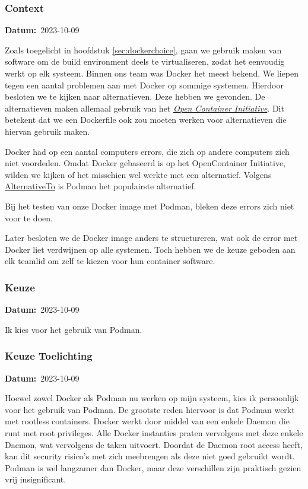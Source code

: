 \documentclass[a4paper]{report}
\newcommand{\timestamp}[1]{
  \mbox{\scriptsize \textbf{Datum:} #1} \smallbreak
}
\begin{document}
\subsubsection{Context}
\timestamp{2023-10-09}
Zoals toegelicht in hoofdstuk \ref{sec:dockerchoice}, gaan we gebruik maken van software om de build environment deels te virtualiseren, zodat het eenvoudig werkt op elk systeem.
Binnen ons team was Docker het meest bekend. We liepen tegen een aantal problemen aan met Docker op sommige systemen. 
Hierdoor besloten we te kijken naar alternatieven. Deze hebben we gevonden. De alternatieven maken allemaal gebruik van het \href{https://opencontainers.org/}{\textit{Open Container Initiative}}.
Dit betekent dat we een Dockerfile ook zou moeten werken voor alternatieven die hiervan gebruik maken.
\par\smallskip
Docker had op een aantal computers errors, die zich op andere computers zich niet voordeden. 
Omdat Docker gebaseerd is op het OpenContainer Initiative, wilden we kijken of het misschien wel werkte met een alternatief.
Volgens \href{https://alternativeto.net/software/docker/}{AlternativeTo} is Podman het populairste alternatief.
\par\smallskip
Bij het testen van onze Docker image met Podman, bleken deze errors zich niet voor te doen.
\par\smallskip 
Later besloten we de Docker image anders te structureren, wat ook de error met Docker liet verdwijnen op alle systemen. 
Toch hebben we de keuze geboden aan elk teamlid om zelf te kiezen voor hun container software.

\subsubsection{Keuze}
\timestamp{2023-10-09}
Ik kies voor het gebruik van Podman.

\subsubsection{Keuze Toelichting}
\timestamp{2023-10-09}
Hoewel zowel Docker als Podman nu werken op mijn systeem, kies ik persoonlijk voor het gebruik van Podman.
De grootste reden hiervoor is dat Podman werkt met rootless containers. Docker werkt door middel van een enkele Daemon die runt met root privileges. 
Alle Docker instanties praten vervolgens met deze enkele Daemon, wat vervolgens de taken uitvoert. Doordat de Daemon root access heeft, kan dit security risico's met zich meebrengen als deze niet goed gebruikt wordt\cite{dockerdaemonrisks}.
Podman is wel langzamer dan Docker, maar deze verschillen zijn praktisch gezien vrij insignificant\cite{dockerperformance}.
\end{document}
